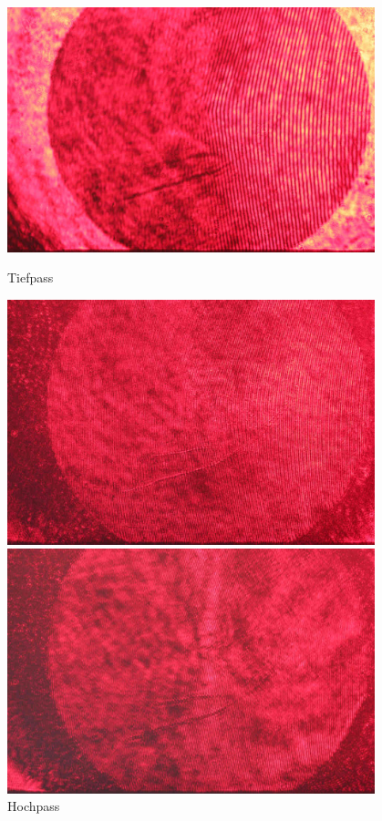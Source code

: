             \begin{figure}[H]
                  \begin{minipage}{0.33\textwidth}
                   \centering
                    \includegraphics[width=0.95\textwidth]{Abb/Abb_10.JPG}
                    \caption{Tiefpass}
                  \end{minipage}\hfill
                  \begin{minipage}{0.33\textwidth}
                   \centering
                    \includegraphics[width=0.95\textwidth]{Abb/Abb_11.JPG}
                    \caption{Hochpass}
                  \end{minipage}\hfill
                  \begin{minipage}{0.33\textwidth}
                   \centering
                    \includegraphics[width=0.95\textwidth]{Abb/Abb_12.JPG}

\end{minipage}
\end{figure}
